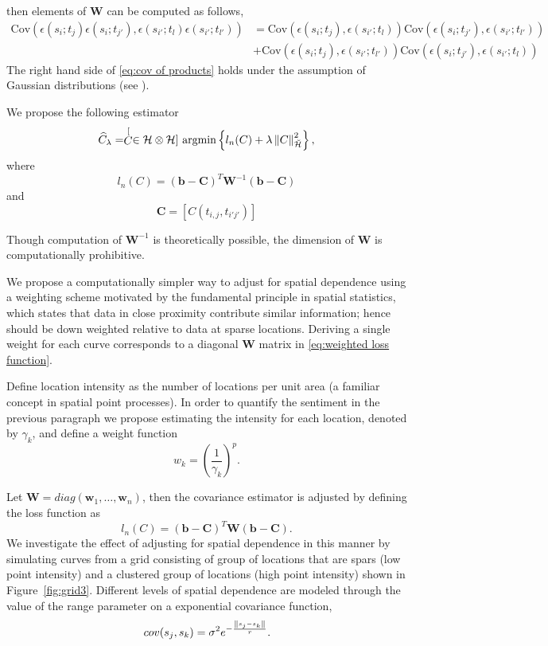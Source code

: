 then elements of $\mathbf{W}$ can be computed as follows, 
\begin{align}
	\text{Cov}(\epsilon(s_i; t_{j}) \epsilon(s_i;t_{j'}), \epsilon(s_{i'}; t_{l}) \epsilon(s_{i'};t_{l'}) ) &= \text{Cov}(\epsilon(s_i; t_{j}), \epsilon(s_{i'}; t_{l}))\text{Cov}( \epsilon(s_i;t_{j'}), \epsilon(s_{i'};t_{l'}) ) \nonumber \\
	&+ \text{Cov}(\epsilon(s_i; t_{j}), \epsilon(s_{i'};t_{l'}) )\text{Cov}(\epsilon(s_i;t_{j'}), \epsilon(s_{i'}; t_{l})) \label{eq:cov of products} 
\end{align}
The right hand side of \eqref{eq:cov of products} holds under the assumption of Gaussian distributions (see \cite{Bohrnstedt:2010ud}). 

We propose the following estimator
\[ \widehat{C}_{\lambda}=\stackrel[C \in \mathcal{H}\otimes \mathcal{H}]{}{\text{ argmin}} \left\{ l_{n}(C)+\lambda\left\Vert C\right\Vert _{\breve{\mathcal{H}}}^{2} \right\}, \]
where 
\begin{equation}
	l_{n}(C)= (\mathbf{b} - \mathbf{C})^T\mathbf{W}^{-1}(\mathbf{b} - \mathbf{C}) \label{eq:weighted loss function} 
\end{equation}
and
\[ \mathbf{C} = [C(t_{i,j}, t_{i'j'})] \]

Though computation of $\mathbf{W}^{-1}$ is theoretically possible, the dimension of $\mathbf{W}$ is computationally prohibitive. 

We propose a computationally simpler way to adjust for spatial dependence using a weighting scheme motivated by the fundamental principle in spatial statistics, which states that data in close proximity contribute similar information; hence should be down weighted relative to data at sparse locations. Deriving a single weight for each curve corresponds to a diagonal $\mathbf{W}$ matrix in \eqref{eq:weighted loss function}. 

Define location intensity as the number of locations per unit area (a familiar concept in spatial point processes). In order to quantify the sentiment in the previous paragraph we propose estimating the intensity for each location, denoted by $\gamma_k$, and define a weight function 
\begin{equation}
	w_k = \left(\frac{1}{\gamma_k}\right)^p. 
\end{equation}

Let $\mathbf{W} = diag(\mathbf{w}_1, \dots, \mathbf{w}_n)$, then the covariance estimator is adjusted by defining the loss function as 
\begin{equation}
	l_{n}(C)= (\mathbf{b} - \mathbf{C})^T\mathbf{W}(\mathbf{b} - \mathbf{C}). \label{eq:diag weighted loss function} 
\end{equation}
We investigate the effect of adjusting for spatial dependence in this manner by simulating curves from a grid consisting of group of locations that are spars (low point intensity) and a clustered group of locations (high point intensity) shown in Figure~\ref{fig:grid3}. Different levels of spatial dependence are modeled through the value of the range parameter on a exponential covariance function,
\begin{equation}
	cov(s_j, s_k) = \sigma^2e^{-\frac{\left\|s_j - s_k\right\|}{r}}. 
\end{equation}

